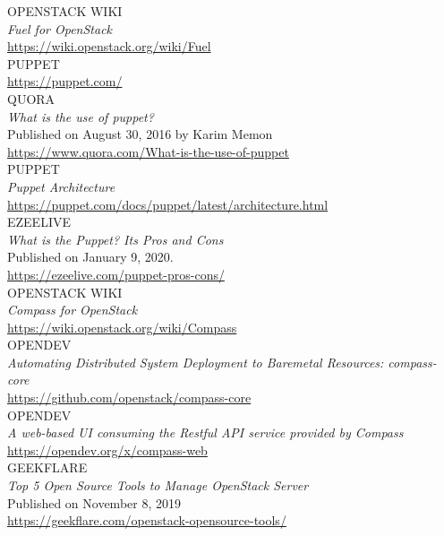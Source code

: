 \documentclass[a4paper, 12pt]{article}
\begin{document}
\noindent
OPENSTACK WIKI\\
\textit{Fuel for OpenStack}\\
\href{https://wiki.openstack.org/wiki/Fuel}{https://wiki.openstack.org/wiki/Fuel}\\

\noindent
PUPPET\\
\href{https://puppet.com/}{https://puppet.com/}\\

\noindent
QUORA\\
\textit{What is the use of puppet?}\\
Published on August 30, 2016 by Karim Memon\\
\href{https://www.quora.com/What-is-the-use-of-puppet}{https://www.quora.com/What-is-the-use-of-puppet}\\

\noindent
PUPPET\\
\textit{Puppet Architecture}\\
\href{https://puppet.com/docs/puppet/latest/architecture.html}{https://puppet.com/docs/puppet/latest/architecture.html}\\

\newpage
\noindent
EZEELIVE\\
\textit{What is the Puppet? Its Pros and Cons}\\
Published on January 9, 2020.\\
\href{https://ezeelive.com/puppet-pros-cons/}{https://ezeelive.com/puppet-pros-cons/}\\

\noindent
OPENSTACK WIKI\\
\textit{Compass for OpenStack}\\
\href{https://wiki.openstack.org/wiki/Compass}{https://wiki.openstack.org/wiki/Compass}\\

\noindent
OPENDEV\\
\textit{Automating Distributed System Deployment to Baremetal Resources: compass-core}\\
\href{https://github.com/openstack/compass-core}{https://github.com/openstack/compass-core}\\

\noindent
OPENDEV\\
\textit{A web-based UI consuming the Restful API service provided by Compass}\\
\href{https://opendev.org/x/compass-web}{https://opendev.org/x/compass-web}\\

\noindent
GEEKFLARE\\
\textit{Top 5 Open Source Tools to Manage OpenStack Server}\\
Published on November 8, 2019\\
\href{https://geekflare.com/openstack-opensource-tools/}{https://geekflare.com/openstack-opensource-tools/}\\
\end{document}
